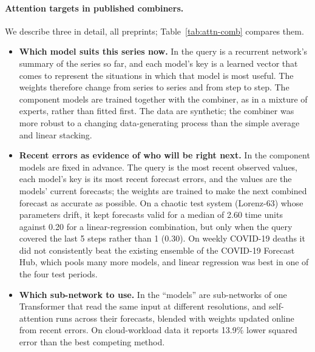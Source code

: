 \paragraph{Attention targets in published combiners.} We describe three in detail, all preprints;
Table~\ref{tab:attn-comb} compares them.
\begin{itemize}[leftmargin=1.5em,itemsep=1pt]
\item \textbf{Which model suits this series now.} In \citet{bourgin2021maes} the query is a recurrent network's
  summary of the series so far, and each model's key is a learned vector that comes to represent the
  situations in which that model is most useful. The weights therefore change from series to series and from
  step to step. The component models are trained together with the combiner, as in a mixture of experts,
  rather than fitted first. The data are synthetic; the combiner was more robust to a changing data-generating
  process than the simple average and linear stacking.
\item \textbf{Recent errors as evidence of who will be right next.} In \citet{patel2023attnpool} the component
  models are fixed in advance. The query is the most recent observed values, each model's key is its most recent
  forecast errors, and the values are the models' current forecasts; the weights are trained to make the next
  combined forecast as accurate as possible. On a chaotic test system (Lorenz-63) whose parameters drift, it kept
  forecasts valid for a median of 2.60 time units against 0.20 for a linear-regression combination, but only
  when the query covered the last 5 steps rather than 1 (0.30). On weekly COVID-19 deaths it did not
  consistently beat the existing ensemble of the COVID-19 Forecast Hub, which pools many more models, and linear
  regression was best in one of the four test periods.
\item \textbf{Which sub-network to use.} In \citet{chen2025e3former} the ``models'' are sub-networks of one
  Transformer that read the same input at different resolutions, and self-attention runs across their forecasts,
  blended with weights updated online from recent errors. On cloud-workload data it reports 13.9\% lower
  squared error than the best competing method.
\end{itemize}

